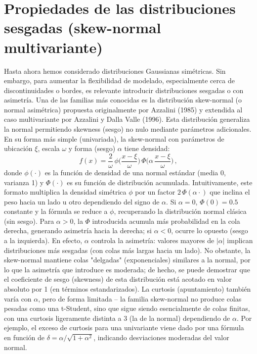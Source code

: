 \section{Propiedades de las distribuciones sesgadas (skew-normal multivariante)}
Hasta ahora hemos considerado distribuciones Gaussianas simétricas. Sin embargo, para aumentar la flexibilidad de modelado, 
especialmente cerca de discontinuidades o bordes, es relevante introducir distribuciones sesgadas o con asimetría. Una de las familias más 
conocidas es la distribución skew-normal (o normal asimétrica) propuesta originalmente por Azzalini (1985) y extendida al caso multivariante 
por Azzalini y Dalla Valle (1996). Esta distribución generaliza la normal permitiendo skewness (sesgo) no nulo mediante parámetros adicionales. 
En su forma más simple (univariada), la skew-normal con parámetros de ubicación $\xi$, escala $\omega$ y forma (sesgo) $\alpha$ tiene densidad:
$$f(x) = \frac{2}{\omega} \,\phi\!\Big(\frac{x-\xi}{\omega}\Big)\,\Phi\!\Big(\alpha \,\frac{x-\xi}{\omega}\Big)\,,$$
donde $\phi(\cdot)$ es la función de densidad de una normal estándar (media 0, varianza 1) y $\Phi(\cdot)$ es su función de distribución acumulada. 
Intuitivamente, este formato multiplica la densidad simétrica $\phi$ por un factor $2\,\Phi(\alpha\cdot)$ que inclina el peso hacia un lado u otro 
dependiendo del signo de $\alpha$. Si $\alpha=0$, $\Phi(0)=0.5$ constante y la fórmula se reduce a $\phi$, recuperando la distribución normal clásica 
(sin sesgo). Para $\alpha > 0$, la $\Phi$ introducida acumula más probabilidad en la cola derecha, generando asimetría hacia la derecha; 
si $\alpha < 0$, ocurre lo opuesto (sesgo a la izquierda). En efecto, $\alpha$ controla la asimetría: valores mayores de $|\alpha|$ implican 
distribuciones más sesgadas (con colas más largas hacia un lado). No obstante, la skew-normal mantiene colas "delgadas" (exponenciales) 
similares a la normal, por lo que la asimetría que introduce es moderada; de hecho, se puede demostrar que el coeficiente de sesgo (skewness) 
de esta distribución está acotado en valor absoluto por 1 (en términos estandarizados). La curtosis (apuntamiento) también varía con $\alpha$, 
pero de forma limitada – la familia skew-normal no produce colas pesadas como una t-Student, sino que sigue siendo esencialmente de colas finitas, 
con una curtosis ligeramente distinta a 3 (la de la normal) dependiendo de $\alpha$. Por ejemplo, el exceso de curtosis para una univariante 
viene dado por una fórmula en función de $\delta = \alpha/\sqrt{1+\alpha^2}$, indicando desviaciones moderadas del valor normal.

